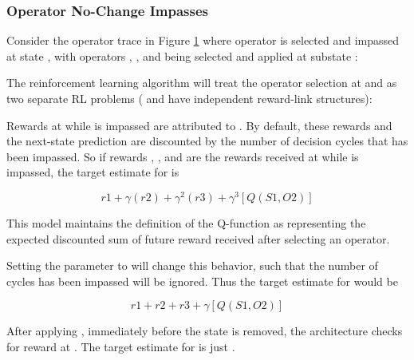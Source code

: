 \subsubsection{Operator No-Change Impasses}
Consider the operator trace in Figure \ref{fig:rl-optrace} where operator  is selected and impassed at state , with operators , , and  being selected and applied at substate :

\begin{figure}
\label{fig:rl-optrace}
\end{figure}

The reinforcement learning algorithm will treat the operator selection at  and  as two separate RL problems ( and  have independent reward-link structures):

\begin{list}{S1}
\item Rewards at  while  is impassed are attributed to . By default, these rewards and the next-state prediction are discounted by the number of decision cycles that  has been impassed.  So if rewards , , and  are the rewards received at  while  is impassed, the target estimate for  is

$$r1 + \gamma(r2) + \gamma^2(r3) + \gamma^3[  Q(S1, O2)  ]$$

This model maintains the definition of the Q-function as representing the expected discounted sum of future reward received after selecting an operator.

Setting the  parameter to  will change this behavior, such that the number of cycles  has been impassed will be ignored.  Thus the target estimate for  would be

$$r1 + r2 + r3 + \gamma[  Q(S1, O2)  ]$$

\end{list}

\begin{list}{S2}
\item After applying , immediately before the state  is removed, the architecture checks for reward  at . The target estimate for  is just .

\end{list}

